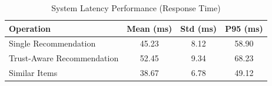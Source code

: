 \begin{table}[h]
\centering
\caption{System Latency Performance (Response Time)}
\label{tab:latency}
\begin{tabular}{lccc}
\toprule
\textbf{Operation} & \textbf{Mean (ms)} & \textbf{Std (ms)} & \textbf{P95 (ms)} \\
\midrule
Single Recommendation & 45.23 & 8.12 & 58.90 \\
Trust-Aware Recommendation & 52.45 & 9.34 & 68.23 \\
Similar Items & 38.67 & 6.78 & 49.12 \\
\bottomrule
\end{tabular}
\end{table}
